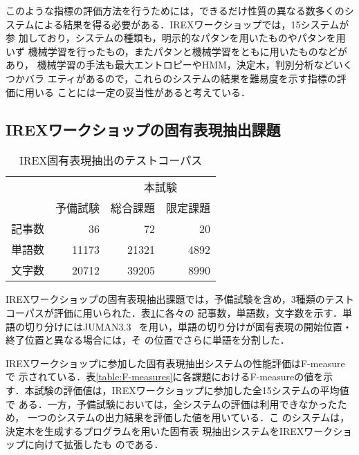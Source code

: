 このような指標の評価方法を行うためには，できるだけ性質の異なる数多くのシ
ステムによる結果を得る必要がある．IREXワークショップでは，15システムが参
加しており，システムの種類も，明示的なパタンを用いたものやパタンを用いず
機械学習を行ったもの，またパタンと機械学習をともに用いたものなどがあり，
機械学習の手法も最大エントロピーやHMM，決定木，判別分析などいくつかバラ
エティがあるので，これらのシステムの結果を難易度を示す指標の評価に用いる
ことには一定の妥当性があると考えている．


\subsection{\label{section:IREX_NE}IREXワークショップの固有表現抽出課題}

\begin{table}[t]\small
\caption{\label{table:preliminary_comparison}IREX固有表現抽出のテストコーパス}
\begin{center}
\begin{tabular}{|l||r|r|r|} \hline
       &          & \multicolumn{2}{|c|}{本試験}\\ \cline{3-4}
       & 予備試験 & 総合課題 & 限定課題 \\ \hline
記事数 &       36 &       72 &       20 \\
単語数 &    11173 &    21321 &     4892 \\ 
文字数 &    20712 &    39205 &     8990 \\ \hline
\end{tabular}
\end{center}
\end{table}

IREXワークショップの固有表現抽出課題では，予備試験を含め，3種類のテスト
コーパスが評価に用いられた．表\ref{table:preliminary_comparison}に各々の
記事数，単語数，文字数を示す．単語の切り分けにはJUMAN3.3~\cite{JUMAN33}
を用い，単語の切り分けが固有表現の開始位置・終了位置と異なる場合には，そ
の位置でさらに単語を分割した．

IREXワークショップに参加した固有表現抽出システムの性能評価はF-measureで
示されている．表\ref{table:F-measures}に各課題におけるF-measureの値を示
す．本試験の評価値は，IREXワークショップに参加した全15システムの平均値で
ある．一方，予備試験においては，全システムの評価は利用できなかったため，
一つのシステム\cite{nobata:irex1}の出力結果を評価した値を用いている．こ
のシステムは，決定木を生成するプログラム\cite{quinlan:93}を用いた固有表
現抽出システム\cite{sekine:wvlc98}をIREXワークショップに向けて拡張したも
のである．

